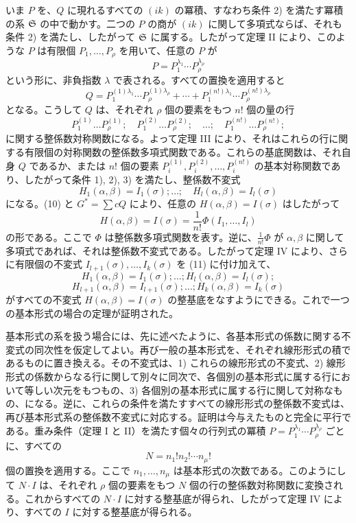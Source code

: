 \documentclass[11pt]{article}
\begin{document}
いま \(P\) を、\(Q\) に現れるすべての \((ik)\) の冪積、すなわち条件 2) を満たす冪積の系 \(\mathfrak S\) の中で動かす。二つの \(P\) の商が \((ik)\) に関して多項式ならば、それも条件 2) を満たし、したがって \(\mathfrak S\) に属する。したがって定理 II により、このような \(P\) は有限個 \(P_1,\ldots,P_\rho\) を用いて、任意の \(P\) が
\[
        P=P_1^{\lambda_1}\cdots P_\rho^{\lambda_\rho}
\]
という形に、非負指数 \(\lambda\) で表される。すべての置換を適用すると
\[
        Q=
        P_1^{(1)\lambda_1}\cdots P_\rho^{(1)\lambda_\rho}
        +\cdots+
        P_1^{(n!)\lambda_1}\cdots P_\rho^{(n!)\lambda_\rho}
\]
となる。こうして \(Q\) は、それぞれ \(\rho\) 個の要素をもつ \(n!\) 個の量の行
\[
        P_1^{(1)}\ldots P_\rho^{(1)};
        \quad
        P_1^{(2)}\ldots P_\rho^{(2)};
        \quad \ldots;\quad
        P_1^{(n!)}\ldots P_\rho^{(n!)};
\]
に関する整係数対称関数になる。よって定理 III により、それはこれらの行に関する有限個の対称関数の整係数多項式関数である。これらの基底関数は、それ自身 \(Q\) であるか、または \(n!\) 個の要素 \(P_i^{(1)},P_i^{(2)},\ldots,P_i^{(n!)}\) の基本対称関数であり、したがって条件 1), 2), 3) を満たし、整係数不変式
\begin{equation}
        H_1(\alpha,\beta)=I_1(\sigma);\ldots;\quad
        H_l(\alpha,\beta)=I_l(\sigma)
\end{equation}
になる。(10) と \(G^*=\sum cQ\) により、任意の \(H(\alpha,\beta)=I(\sigma)\) はしたがって
\[
        H(\alpha,\beta)=I(\sigma)=\frac1{n!}\Phi(I_1,\ldots,I_l)
\]
の形である。ここで \(\Phi\) は整係数多項式関数を表す。逆に、\(\frac1{n!}\Phi\) が \(\alpha,\beta\) に関して多項式であれば、それは整係数不変式である。したがって定理 IV により、さらに有限個の不変式 \(I_{l+1}(\sigma),\ldots,I_k(\sigma)\) を (11) に付け加えて、
\[
        H_1(\alpha,\beta)=I_1(\sigma);\ldots;H_l(\alpha,\beta)=I_l(\sigma);
\]
\[
        H_{l+1}(\alpha,\beta)=I_{l+1}(\sigma);\ldots;H_k(\alpha,\beta)=I_k(\sigma)
\]
がすべての不変式 \(H(\alpha,\beta)=I(\sigma)\) の整基底をなすようにできる。これで一つの基本形式の場合の定理が証明された。

基本形式の系を扱う場合には、先に述べたように、各基本形式の係数に関する不変式の同次性を仮定してよい。再び一般の基本形式を、それぞれ線形形式の積であるものに置き換える。その不変式は、1) これらの線形形式の不変式、2) 線形形式の係数からなる行に関して別々に同次で、各個別の基本形式に属する行において等しい次元をもつもの、3) 各個別の基本形式に属する行に関して対称なもの、になる。逆に、これらの条件を満たすすべての線形形式の整係数不変式は、再び基本形式系の整係数不変式に対応する。証明は今与えたものと完全に平行である。重み条件（定理 I と II）を満たす個々の行列式の冪積 \(P=P_1^{\lambda_1}\cdots P_\rho^{\lambda_\rho}\) ごとに、すべての
\[
        N=n_1!n_2!\cdots n_\mu!
\]
個の置換を適用する。ここで \(n_1,\ldots,n_\mu\) は基本形式の次数である。このようにして \(N\cdot I\) は、それぞれ \(\rho\) 個の要素をもつ \(N\) 個の行の整係数対称関数に変換される。これからすべての \(N\cdot I\) に対する整基底が得られ、したがって定理 IV により、すべての \(I\) に対する整基底が得られる。
\end{document}
